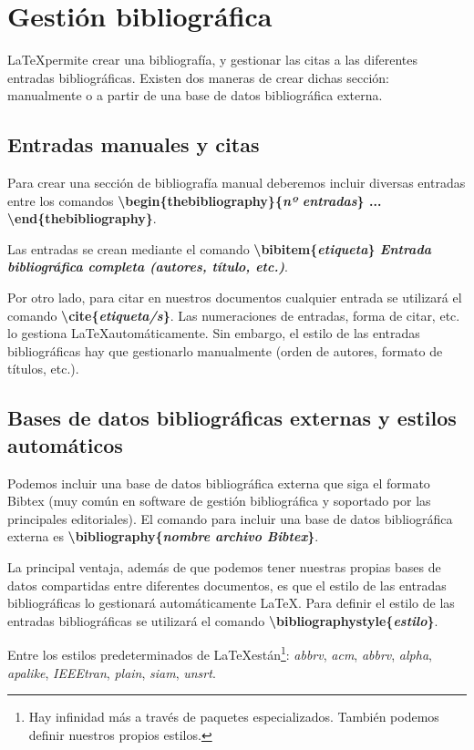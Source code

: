 \chapter{Gestión bibliográfica}

\LaTeX permite crear una bibliografía, y gestionar las citas a las diferentes entradas bibliográficas. Existen dos maneras de crear dichas sección: manualmente o a partir de una base de datos bibliográfica externa.

\section{Entradas manuales y citas}

Para crear una sección de bibliografía manual deberemos incluir diversas entradas entre los comandos \textbf{\textbackslash begin\{thebibliography\}\{\emph{nº entradas}\} ... \textbackslash end\{thebibliography\}}.

Las entradas se crean mediante el comando \textbf{\textbackslash bibitem\{\emph{etiqueta}\} \emph{Entrada bibliográfica completa (autores, título, etc.)}}.

Por otro lado, para citar en nuestros documentos cualquier entrada se utilizará el comando \textbf{\textbackslash cite\{\emph{etiqueta/s}\}}. Las numeraciones de entradas, forma de citar, etc. lo gestiona \LaTeX automáticamente. Sin embargo, el estilo de las entradas bibliográficas hay que gestionarlo manualmente (orden de autores, formato de títulos, etc.).

\section{Bases de datos bibliográficas externas y estilos automáticos}

Podemos incluir una base de datos bibliográfica externa que siga el formato Bibtex (muy común en software de gestión bibliográfica y soportado por las principales editoriales). El comando para incluir una base de datos bibliográfica externa es \textbf{\textbackslash bibliography\{\emph{nombre archivo Bibtex}\}}.

La principal ventaja, además de que podemos tener nuestras propias bases de datos compartidas entre diferentes documentos, es que el estilo de las entradas bibliográficas lo gestionará automáticamente \LaTeX. Para definir el estilo de las entradas bibliográficas se utilizará el comando \textbf{\textbackslash bibliographystyle\{\emph{estilo}\}}.

Entre los estilos predeterminados de \LaTeX están\footnote{Hay infinidad más a través de paquetes especializados. También podemos definir nuestros propios estilos.}: \emph{abbrv}, \emph{acm}, \emph{abbrv}, \emph{alpha}, \emph{apalike}, \emph{IEEEtran}, \emph{plain}, \emph{siam}, \emph{unsrt}.

